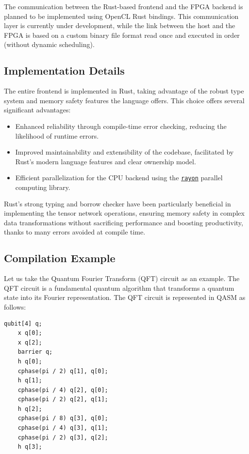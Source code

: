 \documentclass[12pt,oneside,a4paper]{article}
\begin{document}
The communication between the Rust-based frontend and the FPGA backend is planned to be implemented using OpenCL Rust bindings. This communication layer is currently under development, while the link between the host and the FPGA is based on a custom binary file format read once and executed in order (without dynamic scheduling).

\subsection{Implementation Details}

The entire frontend is implemented in Rust, taking advantage of the robust type system and memory safety features the language offers. This choice offers several significant advantages:

\begin{itemize}
    \item Enhanced reliability through compile-time error checking, reducing the likelihood of runtime errors.
    \item Improved maintainability and extensibility of the codebase, facilitated by Rust's modern language features and clear ownership model.
    \item Efficient parallelization for the CPU backend using the \href{https://github.com/rayon-rs/rayon}{\texttt{rayon}} parallel computing library.
\end{itemize}

Rust's strong typing and borrow checker have been particularly beneficial in implementing the tensor network operations, ensuring memory safety in complex data transformations without sacrificing performance and boosting productivity, thanks to many errors avoided at compile time.

\subsection{Compilation Example}

Let us take the Quantum Fourier Transform (QFT)\cite{coppersmith2002approximatefouriertransformuseful} circuit as an example. The QFT circuit is a fundamental quantum algorithm that transforms a quantum state into its Fourier representation. The QFT circuit is represented in QASM as follows:

\begin{lstlisting}[style=qasm, caption={QFT Circuit in QASM}]
	qubit[4] q;
	x q[0];
	x q[2];
	barrier q;
	h q[0];
	cphase(pi / 2) q[1], q[0];
	h q[1];
	cphase(pi / 4) q[2], q[0];
	cphase(pi / 2) q[2], q[1];
	h q[2];
	cphase(pi / 8) q[3], q[0];
	cphase(pi / 4) q[3], q[1];
	cphase(pi / 2) q[3], q[2];
	h q[3];
\end{lstlisting}
\end{document}
